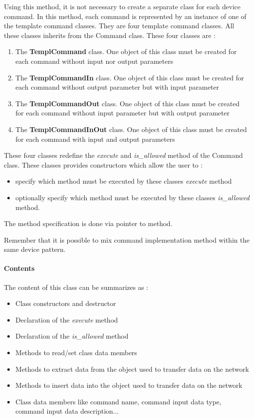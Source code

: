 Using this method, it is not necessary to create a separate class
for each device command. In this method, each command is represented
by an instance of one of the template command classes.
They are four template command classes. All these classes inherits
from the Command class. These four classes are :
\begin{enumerate}
\item The \textbf{TemplCommand} class. One object of
this class must be created for each command without input nor output
parameters
\item The \textbf{TemplCommandIn} class. One object
of this class must be created for each command without output parameter
but with input parameter
\item The \textbf{TemplCommandOut} class. One object
of this class must be created for each command without input parameter
but with output parameter
\item The \textbf{TemplCommandInOut} class. One
object of this class must be created for each command with input and
output parameters
\end{enumerate}
These four classes redefine the \emph{execute} and
\emph{is\_allowed} method of the Command class.
These classes provides constructors which allow the user to :
\begin{itemize}
\item specify which method must be executed by these classes \emph{execute}
method
\item optionally specify which method must be executed by these classes
\emph{is\_allowed} method.
\end{itemize}
The method specification is done via pointer to method.

Remember that it is possible to mix command implementation method
within the same device pattern.

\paragraph{Contents}

The content of this class can be summarizes as :
\begin{itemize}
\item Class constructors and destructor
\item Declaration of the \emph{execute} method
\item Declaration of the \emph{is\_allowed} method
\item Methods to read/set class data members
\item Methods to extract data from the object used to transfer
data on the network
\item Methods to insert data into the object used to transfer
data on the network
\item Class data members like command name, command input data type, command
input data description...
\end{itemize}

